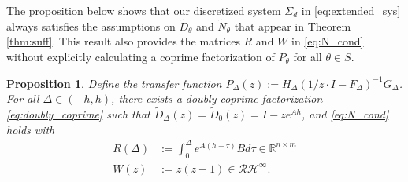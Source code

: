 \documentclass[letterpaper, 12pt, draftcls, onecolumn]{ieeeconf}
\newtheorem{proposition}[theorem]{Proposition}
\begin{document}
The proposition below shows that our discretized system $\Sigma_d$ in \eqref{eq:extended_sys}
always satisfies
the assumptions on $\tilde D_{\theta}$ and $\tilde N_{\theta}$
that appear in Theorem \ref{thm:suff}. 
This result also provides the matrices $R$ and $W$ in \eqref{eq:N_cond}
without explicitly calculating a coprime factorization of $P_{\theta}$ 
for all $\theta \in S$.
\begin{proposition}
	\label{prop:DN_cond}
Define the transfer function $P_{\Delta}(z) := 
	H_{\Delta} (1/z\cdot I - F_{\Delta})^{-1} G_{\Delta}$.
	For all $\Delta \in (-h,h)$,
	there exists a doubly coprime factorization \eqref{eq:doubly_coprime}
	such that $\tilde D_{\Delta}(z) = \tilde D_{0}(z) = I - ze^{Ah}$,
and 
	\eqref{eq:N_cond} holds with
	\begin{align}
	R(\Delta) &:= \int^{\Delta}_0 e^{A(h-\tau)}B d\tau 
	\in \mathbb{R}^{n \times m} \label{eq:R_def}\\
	W(z) &:= z(z-1) \in \mathcal{RH}^{\infty}. \label{eq:W_def}
	\end{align}
\end{proposition}
\end{document}
